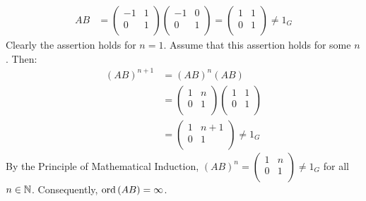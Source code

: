 \documentclass{article}
\begin{document}
\begin{equation}
    \begin{split}
        AB & = \begin{pmatrix}
            -1 & 1 \\ 0 & 1 \\
        \end{pmatrix} \begin{pmatrix}
            -1 & 0 \\ 0 & 1 \\
        \end{pmatrix} = \begin{pmatrix}
            1 & 1 \\ 0 & 1 \\
        \end{pmatrix} \neq 1_{G}
    \end{split}
\end{equation}
Clearly the assertion holds for $n = 1$. Assume that this assertion holds for some $n$. Then:
\begin{equation}
    \begin{split}
        \left(AB\right)^{n + 1} & = \left(AB\right)^n\left(AB\right) \\
        & = \begin{pmatrix} 1 & n \\ 0 & 1 \\ \end{pmatrix}\begin{pmatrix} 1 & 1 \\ 0 & 1 \\ \end{pmatrix} \\
        & = \begin{pmatrix} 1 & n + 1 \\ 0 & 1 \\ \end{pmatrix} \neq 1_{G}
    \end{split}
\end{equation}
By the Principle of Mathematical Induction, $\left(AB\right)^n = \begin{pmatrix} 1 & n \\ 0 & 1 \\ \end{pmatrix} \neq 1_{G}$ for all $n \in \mathbb{N}$. Consequently, $\operatorname{ord}\left(AB\right) = \infty$.
\end{document}
